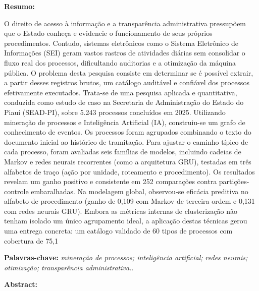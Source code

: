 \noindent\textbf{Resumo:}

\noindent O direito de acesso à informação e a transparência administrativa pressupõem que o Estado conheça e evidencie o funcionamento de seus próprios procedimentos. Contudo, sistemas eletrônicos como o Sistema Eletrônico de Informações (SEI) geram vastos rastros de atividades diárias sem consolidar o fluxo real dos processos, dificultando auditorias e a otimização da máquina pública. O problema desta pesquisa consiste em determinar se é possível extrair, a partir desses registros brutos, um catálogo auditável e confiável dos processos efetivamente executados. Trata-se de uma pesquisa aplicada e quantitativa, conduzida como estudo de caso na Secretaria de Administração do Estado do Piauí (SEAD-PI), sobre 5.243 processos concluídos em 2025. Utilizando mineração de processos e Inteligência Artificial (IA), construiu-se um grafo de conhecimento de eventos. Os processos foram agrupados combinando o texto do documento inicial ao histórico de tramitação. Para ajustar o caminho típico de cada processo, foram avaliadas seis famílias de modelos, incluindo cadeias de Markov e redes neurais recorrentes (como a arquitetura GRU), testadas em três alfabetos de traço (ação por unidade, roteamento e procedimento). Os resultados revelam um ganho positivo e consistente em 252 comparações contra partições-controle embaralhadas. Na modelagem global, observou-se eficácia preditiva no alfabeto de procedimento (ganho de 0,109 com Markov de terceira ordem e 0,131 com redes neurais GRU). Embora as métricas internas de clusterização não tenham isolado um único agrupamento ideal, a aplicação destas técnicas gerou uma entrega concreta: um catálogo validado de 60 tipos de processos com cobertura de 75,1%

\vspace{0.6\baselineskip}
\noindent\textbf{Palavras-chave:} \textit{mineração de processos; inteligência artificial; redes neurais; otimização; transparência administrativa.}.

\vspace{1.2\baselineskip}
\noindent\textbf{Abstract:}

